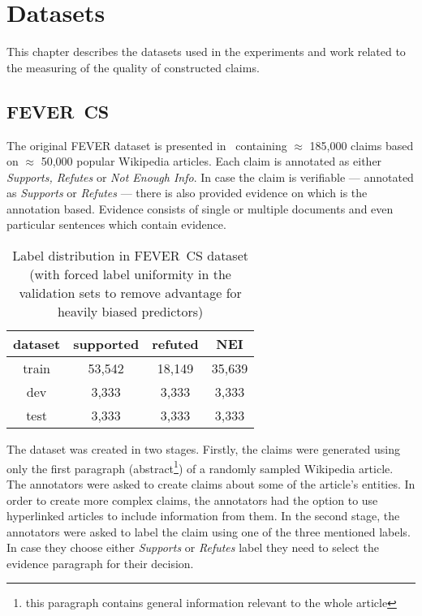 \chapter{Datasets}
\label{chapter:datasets}
    This chapter describes the datasets used in the experiments and work related to the measuring of the quality of constructed claims.

\section{FEVER~CS}
\label{section:fever-dataset}
    The original FEVER dataset is presented in~\parencite{thorne2018fever} containing $\approx$ 185,000 claims based on $\approx$ 50,000 popular Wikipedia articles. Each claim is annotated as either \emph{Supports, Refutes} or \emph{Not Enough Info}. In case the claim is verifiable --- annotated as \emph{Supports} or \emph{Refutes} --- there is also provided evidence on which is the annotation based. Evidence consists of single or multiple documents and even particular sentences which contain evidence.
    
    \begin{table}[h]
        \centering
        \begin{tabular}{ c | c c c }
            \textbf{dataset} & \textbf{supported} & \textbf{refuted} & \textbf{NEI}  \\
            \hline
            train & 53,542 & 18,149 & 35,639\\
            dev & 3,333 & 3,333 & 3,333\\
            test & 3,333 & 3,333 & 3,333\\
        \end{tabular}
        \caption[Label distribution in FEVER~CS dataset]{Label distribution in FEVER~CS dataset (with forced label uniformity in the validation sets to remove advantage for heavily biased predictors)}
        \label{table:fever-label-split}
    \end{table}
    
    The dataset was created in two stages. Firstly, the claims were generated using only the first paragraph (abstract\footnote{this paragraph contains general information relevant to the whole article}) of a randomly sampled Wikipedia article. The annotators were asked to create claims about some of the article's entities. In order to create more complex claims, the annotators had the option to use hyperlinked articles to include information from them. In the second stage, the annotators were asked to label the claim using one of the three mentioned labels. In case they choose either \emph{Supports} or \emph{Refutes} label they need to select the evidence paragraph for their decision.
    

